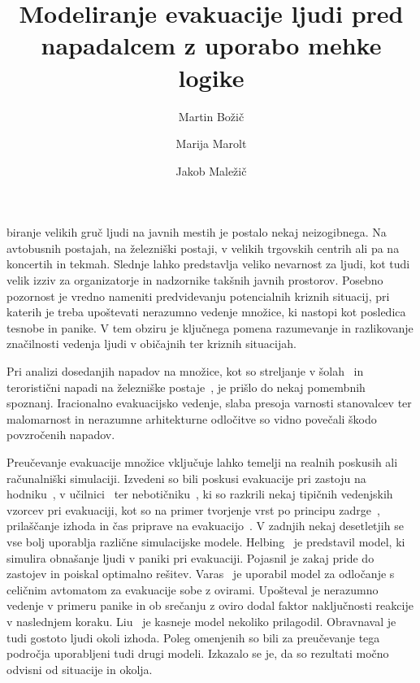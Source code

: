 \documentclass[9pt]{pnas-new}
\title{Modeliranje evakuacije ljudi pred napadalcem z uporabo mehke logike}
\author{Martin Božič}
\author{Marija Marolt}
\author{Jakob Maležič}
\affil{Poročilo seminarske naloge pri predmetu Skupinsko vedenje}
\begin{document}
\verticaladjustment{-2pt}

\maketitle
\thispagestyle{firststyle}

biranje velikih gruč ljudi na javnih mestih je postalo nekaj neizogibnega. Na avtobusnih postajah, na železniški postaji, v velikih trgovskih centrih ali pa na koncertih in tekmah. Slednje lahko predstavlja veliko nevarnost za ljudi, kot tudi velik izziv za organizatorje in nadzornike takšnih javnih prostorov. Posebno pozornost je vredno nameniti predvidevanju potencialnih kriznih situacij, pri katerih je treba upoštevati nerazumno vedenje množice, ki nastopi kot posledica tesnobe in panike. V tem obziru je ključnega pomena razumevanje in razlikovanje značilnosti vedenja ljudi v običajnih ter kriznih situacijah.

Pri analizi dosedanjih napadov na množice, kot so streljanje v šolah~\cite{shootingWiki} in teroristični napadi na železniške postaje~\cite{CunmingWiki}, je prišlo do nekaj pomembnih spoznanj. Iracionalno evakuacijsko vedenje, slaba presoja varnosti stanovalcev ter malomarnost in nerazumne arhitekturne odločitve so vidno povečali škodo povzročenih napadov.

Preučevanje evakuacije množice vključuje lahko temelji na realnih poskusih ali računalniški simulaciji. Izvedeni so bili poskusi evakuacije pri zastoju na hodniku~\cite{bottlenecks2005}, v učilnici~\cite{classroom2008} ter nebotičniku~\cite{building2012}, ki so razkrili nekaj tipičnih vedenjskih vzorcev pri evakuaciji, kot so na primer tvorjenje vrst po principu zadrge~\cite{bottlenecks2005}, prilaščanje izhoda in čas priprave na evakuacijo~\cite{classroom2008}. V zadnjih nekaj desetletjih se vse bolj uporablja različne simulacijske modele. Helbing~\cite{Helbing2000} je predstavil model, ki simulira obnašanje ljudi v paniki pri evakuaciji. Pojasnil je zakaj pride do zastojev in poiskal optimalno rešitev. Varas~\cite{Varas2007} je uporabil model za odločanje s celičnim avtomatom za evakuacije sobe z ovirami. Upošteval je nerazumno vedenje v primeru panike in ob srečanju z oviro dodal faktor naključnosti reakcije v naslednjem koraku. Liu~\cite{Liu2009} je kasneje model nekoliko prilagodil. Obravnaval je tudi gostoto ljudi okoli izhoda. Poleg omenjenih so bili za preučevanje tega področja uporabljeni tudi drugi modeli. Izkazalo se je, da so rezultati močno odvisni od situacije in okolja.
\end{document}
